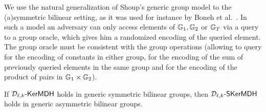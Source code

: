 We use the natural generalization of Shoup's generic group model \cite{EC:Shoup97} to the (a)symmetric bilinear setting, as it was used for instance by Boneh et al.~\cite{EC:BonBoyGoh05}. In such a model an adversary can only access elements of $\mathbb{G}_1,\mathbb{G}_2$ or $\mathbb{G}_T$ via a query to a group oracle, which gives him a randomized  encoding of the queried element. The group oracle must be consistent with the group operations (allowing to query for the encoding of constants in either group, for the encoding of the sum of previously queried elements in the same group and for the encoding of the product of pairs in $\mathbb{G}_1\times \mathbb{G}_2$). %

\begin{lemma} If $\mathcal{D}_{\ell,k}\mbox{-}\mathsf{KerMDH}$ holds in generic symmetric bilinear groups, then $\mathcal{D}_{\ell,k}\mbox{-}\mathsf{SKerMDH}$ holds in generic asymmetric bilinear groups. 
\end{lemma}

